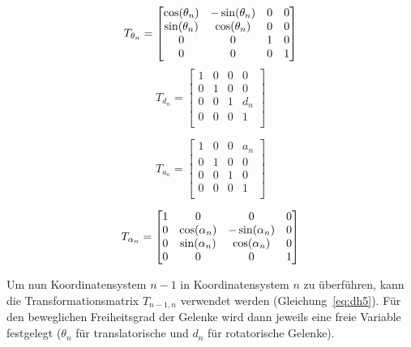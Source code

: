 \begin{equation}
    T_{\theta_n} =
    \begin{bmatrix}
        \cos(\theta_n) & -\sin(\theta_n) & 0 & 0 \\
        \sin(\theta_n) & \cos(\theta_n)  & 0 & 0 \\
        0   & 0    & 1 & 0 \\
        0   & 0    & 0 & 1 \\
    \end{bmatrix}
    \label{eq:dh1}
\end{equation}
\begin{equation}
    T_{d_n} =
    \begin{bmatrix}
        1 & 0 & 0 & 0   \\
        0 & 1 & 0 & 0   \\
        0 & 0 & 1 & d_n \\
        0 & 0 & 0 & 1   \\
    \end{bmatrix}
    \label{eq:dh2}
\end{equation}

\begin{equation}
    T_{a_n} =
    \begin{bmatrix}
        1 & 0 & 0 & a_n \\
        0 & 1 & 0 & 0   \\
        0 & 0 & 1 & 0   \\
        0 & 0 & 0 & 1   \\
    \end{bmatrix}
    \label{eq:dh3}
\end{equation}

\begin{equation}
    T_{\alpha_n} =
    \begin{bmatrix}
        1 & 0   & 0    & 0 \\
        0 & \cos(\alpha_n) & -\sin(\alpha_n) & 0 \\
        0 & \sin(\alpha_n) & \cos(\alpha_n)  & 0 \\
        0 & 0   & 0    & 1 \\
    \end{bmatrix}
    \label{eq:dh4}
\end{equation}

Um nun Koordinatensystem $n-1$ in Koordinatensystem $n$ zu überführen, kann die Transformationsmatrix $T_{n-1,n}$ verwendet werden (Gleichung~\ref{eq:dh5}).
Für den beweglichen Freiheitsgrad der Gelenke wird dann jeweils eine freie Variable festgelegt ($\theta_n$ für translatorische und $d_n$ für rotatorische Gelenke).

